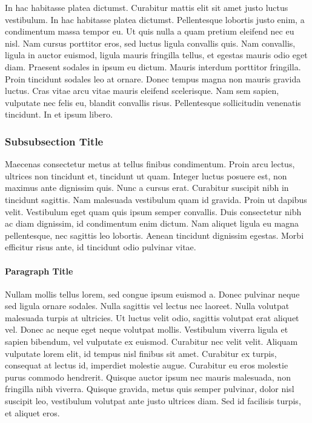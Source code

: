 In hac habitasse platea dictumst. Curabitur mattis elit sit amet justo luctus vestibulum. In hac habitasse platea dictumst. Pellentesque lobortis justo enim, a condimentum massa tempor eu. Ut quis nulla a quam pretium eleifend nec eu nisl. Nam cursus porttitor eros, sed luctus ligula convallis quis. Nam convallis, ligula in auctor euismod, ligula mauris fringilla tellus, et egestas mauris odio eget diam. Praesent sodales in ipsum eu dictum. Mauris interdum porttitor fringilla. Proin tincidunt sodales leo at ornare. Donec tempus magna non mauris gravida luctus. Cras vitae arcu vitae mauris eleifend scelerisque. Nam sem sapien, vulputate nec felis eu, blandit convallis risus. Pellentesque sollicitudin venenatis tincidunt. In et ipsum libero.

\subsubsection{Subsubsection Title} 

Maecenas consectetur metus at tellus finibus condimentum. Proin arcu lectus, ultrices non tincidunt et, tincidunt ut quam. Integer luctus posuere est, non maximus ante dignissim quis. Nunc a cursus erat. Curabitur suscipit nibh in tincidunt sagittis. Nam malesuada vestibulum quam id gravida. Proin ut dapibus velit. Vestibulum eget quam quis ipsum semper convallis. Duis consectetur nibh ac diam dignissim, id condimentum enim dictum. Nam aliquet ligula eu magna pellentesque, nec sagittis leo lobortis. Aenean tincidunt dignissim egestas. Morbi efficitur risus ante, id tincidunt odio pulvinar vitae.

\paragraph{Paragraph Title} Nullam mollis tellus lorem, sed congue ipsum euismod a. Donec pulvinar neque sed ligula ornare sodales. Nulla sagittis vel lectus nec laoreet. Nulla volutpat malesuada turpis at ultricies. Ut luctus velit odio, sagittis volutpat erat aliquet vel. Donec ac neque eget neque volutpat mollis. Vestibulum viverra ligula et sapien bibendum, vel vulputate ex euismod. Curabitur nec velit velit. Aliquam vulputate lorem elit, id tempus nisl finibus sit amet. Curabitur ex turpis, consequat at lectus id, imperdiet molestie augue. Curabitur eu eros molestie purus commodo hendrerit. Quisque auctor ipsum nec mauris malesuada, non fringilla nibh viverra. Quisque gravida, metus quis semper pulvinar, dolor nisl suscipit leo, vestibulum volutpat ante justo ultrices diam. Sed id facilisis turpis, et aliquet eros.

